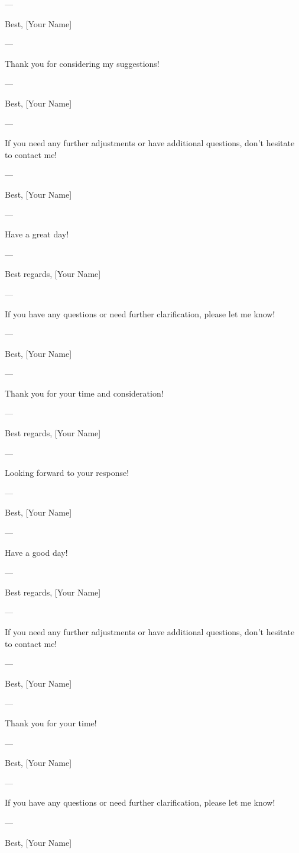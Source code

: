 --- 

Best,  
[Your Name]  

--- 

Thank you for considering my suggestions! 

--- 

Best,  
[Your Name]  

--- 

If you need any further adjustments or have additional questions, don't hesitate to contact me! 

--- 

Best,  
[Your Name]  

--- 

Have a great day! 

--- 

Best regards,  
[Your Name]  

--- 

If you have any questions or need further clarification, please let me know! 

--- 

Best,  
[Your Name]  

--- 

Thank you for your time and consideration! 

--- 

Best regards,  
[Your Name]  

--- 

Looking forward to your response! 

--- 

Best,  
[Your Name]  

--- 

Have a good day! 

--- 

Best regards,  
[Your Name]  

--- 

If you need any further adjustments or have additional questions, don't hesitate to contact me! 

--- 

Best,  
[Your Name]  

--- 

Thank you for your time! 

--- 

Best,  
[Your Name]  

--- 

If you have any questions or need further clarification, please let me know! 

--- 

Best,  
[Your Name]  


